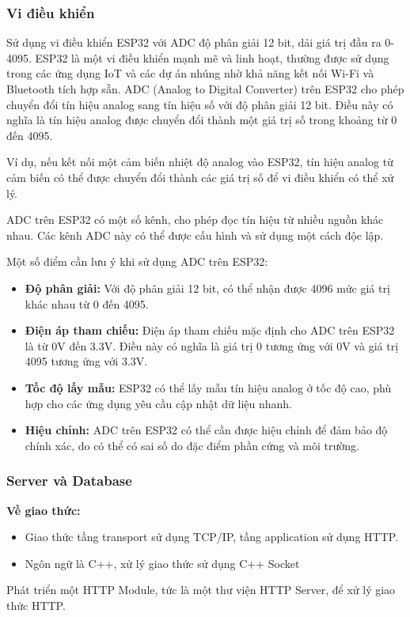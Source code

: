\documentclass{article}
\begin{document}
\subsubsection{Vi điều khiển}
Sử dụng vi điều khiển ESP32 với ADC độ phân giải 12 bit, dải giá trị đầu ra 0-4095. 
ESP32 là một vi điều khiển mạnh mẽ và linh hoạt, thường được sử dụng trong các ứng dụng IoT và các dự án nhúng nhờ khả năng kết nối Wi-Fi và Bluetooth tích hợp sẵn. 
ADC (Analog to Digital Converter) trên ESP32 cho phép chuyển đổi tín hiệu analog sang tín hiệu số với độ phân giải 12 bit. Điều này có nghĩa là tín hiệu analog được chuyển đổi thành một giá trị số trong khoảng từ 0 đến 4095. 

Ví dụ, nếu  kết nối một cảm biến nhiệt độ analog vào ESP32, tín hiệu analog từ cảm biến có thể được chuyển đổi thành các giá trị số để vi điều khiển có thể xử lý. 

ADC trên ESP32 có một số kênh, cho phép đọc tín hiệu từ nhiều nguồn khác nhau. Các kênh ADC này có thể được cấu hình và sử dụng một cách độc lập. 

Một số điểm cần lưu ý khi sử dụng ADC trên ESP32: 
\begin{itemize}
    \item \textbf{Độ phân giải:} Với độ phân giải 12 bit, có thể nhận được 4096 mức giá trị khác nhau từ 0 đến 4095. 
    \item \textbf{Điện áp tham chiếu:} Điện áp tham chiếu mặc định cho ADC trên ESP32 là từ 0V đến 3.3V. Điều này có nghĩa là giá trị 0 tương ứng với 0V và giá trị 4095 tương ứng với 3.3V. 
    \item \textbf{Tốc độ lấy mẫu:} ESP32 có thể lấy mẫu tín hiệu analog ở tốc độ cao, phù hợp cho các ứng dụng yêu cầu cập nhật dữ liệu nhanh. 
    \item \textbf{Hiệu chỉnh:} ADC trên ESP32 có thể cần được hiệu chỉnh để đảm bảo độ chính xác, do có thể có sai số do đặc điểm phần cứng và môi trường. 
\end{itemize}
\subsubsection{Server và Database }
\textbf{Về giao thức:}
\begin{itemize}
    \item Giao thức tầng transport sử dụng TCP/IP, tầng application sử dụng HTTP. 
    \item Ngôn ngữ là C++, xử lý giao thức sử dụng C++ Socket
\end{itemize}
Phát triển một HTTP Module, tức là một thư viện HTTP Server, để xử lý giao thức HTTP.
\end{document}
